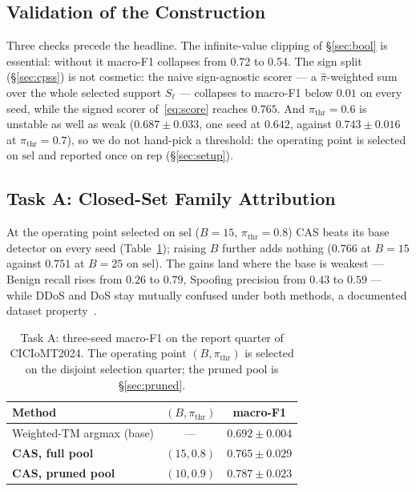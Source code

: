 \documentclass[conference]{IEEEtran}
\begin{document}
\subsection{Validation of the Construction}
\label{sec:validation}
Three checks precede the headline. The infinite-value clipping of
\S\ref{sec:bool} is essential: without it macro-F1 collapses from 0.72
to 0.54. The sign split (\S\ref{sec:cpss}) is not cosmetic: the naive
sign-agnostic scorer --- a $\hat{\pi}$-weighted sum over the whole
selected support $S_\ell$ --- collapses to macro-F1 below $0.01$ on every
seed, while the signed scorer of~\eqref{eq:score} reaches $0.765$. And
$\pi_{\mathrm{thr}}{=}0.6$ is unstable as well as weak
($0.687 \pm 0.033$, one seed at $0.642$, against $0.743 \pm 0.016$ at
$\pi_{\mathrm{thr}}{=}0.7$), so we do not hand-pick a threshold: the
operating point is selected on $\mathrm{sel}$ and reported once on
$\mathrm{rep}$ (\S\ref{sec:setup}).

\subsection{Task A: Closed-Set Family Attribution}
\label{sec:taska}
At the operating point selected on $\mathrm{sel}$ ($B{=}15$,
$\pi_{\mathrm{thr}}{=}0.8$) CAS beats its base detector on every seed
(Table~\ref{tab:headline}); raising $B$ further adds nothing ($0.766$ at
$B{=}15$ against $0.751$ at $B{=}25$ on $\mathrm{sel}$). The gains land
where the base is weakest --- Benign recall rises from $0.26$ to $0.79$,
Spoofing precision from $0.43$ to $0.59$ --- while DDoS and DoS stay
mutually confused under both methods, a documented dataset
property~\cite{domenech2025}.

\begin{table}[!htb]
\centering
\caption{Task A: three-seed macro-F1 on the report quarter of
CICIoMT2024. The operating point $(B, \pi_{\mathrm{thr}})$ is selected on
the disjoint selection quarter; the pruned pool is \S\ref{sec:pruned}.}
\label{tab:headline}
\footnotesize
\begin{tabular}{@{}lcc@{}}
\toprule
Method & $(B, \pi_{\mathrm{thr}})$ & macro-F1 \\
\midrule
Weighted-TM argmax (base) & --- & $0.692 \pm 0.004$ \\
\textbf{CAS, full pool} & $(15, 0.8)$ & $\mathbf{0.765 \pm 0.029}$ \\
\textbf{CAS, pruned pool} & $(10, 0.9)$ & $\mathbf{0.787 \pm 0.023}$ \\
\bottomrule
\end{tabular}
\end{table}
\end{document}

